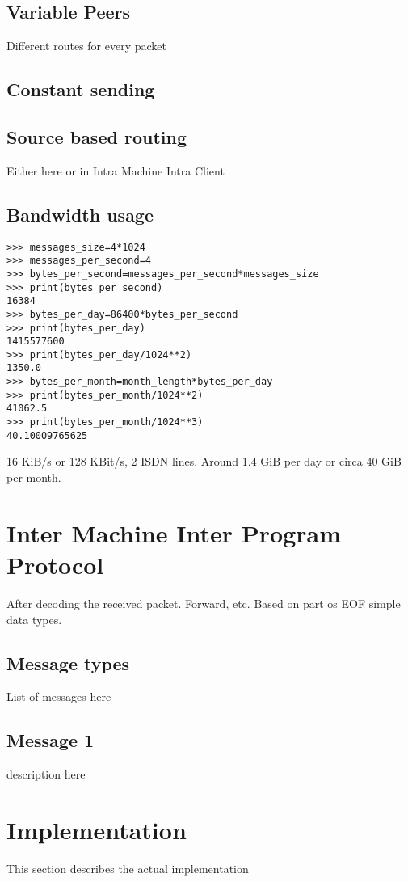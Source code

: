 \documentclass[12pt,a4paper]{article}
\begin{document}
\subsection{Variable Peers}
Different routes for every packet
\subsection{Constant sending}

\subsection{Source based routing}
Either here or in Intra Machine Intra Client

\subsection{Bandwidth usage}
\begin{verbatim}
>>> messages_size=4*1024
>>> messages_per_second=4
>>> bytes_per_second=messages_per_second*messages_size
>>> print(bytes_per_second)
16384
>>> bytes_per_day=86400*bytes_per_second
>>> print(bytes_per_day)
1415577600
>>> print(bytes_per_day/1024**2)
1350.0
>>> bytes_per_month=month_length*bytes_per_day
>>> print(bytes_per_month/1024**2)
41062.5
>>> print(bytes_per_month/1024**3)
40.10009765625
\end{verbatim}
16 KiB/s or 128 KBit/s, 2 ISDN lines. Around 1.4 GiB per day or
circa 40 GiB per month.

\section{Inter Machine Inter Program Protocol}
After decoding the received packet. Forward, etc.
Based on part os EOF simple data types.
\subsection{Message types}
List of messages here
\subsection{Message 1}
description here

\section{Implementation}
This section describes the actual implementation
\end{document}
